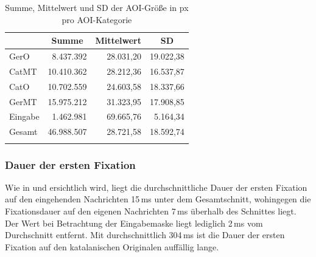 

\begin{table}
\begin{tabular}{lrrr}  
\lsptoprule
    \multicolumn{1}{c}{AOI-Kategorie} & \multicolumn{1}{c}{Summe} & \multicolumn{1}{c}{Mittelwert} & \multicolumn{1}{c}{SD} \\ 
    \midrule
    GerO  & 8.437.392 & 28.031,20 & 19.022,38 \\ 
    CatMT & 10.410.362 & 28.212,36 & 16.537,87 \\ 
    CatO & 10.702.559 & 24.603,58 & 18.337,66 \\ 
    GerMT & 15.975.212 & 31.323,95 & 17.908,85 \\ 
    Eingabe & 1.462.981 & 69.665,76  & 5.164,34 \\ 
    \midrule
    Gesamt & 46.988.507 & 28.721,58 & 18.592,74 \\ 
    \lspbottomrule
\end{tabular}
    \caption{Summe, Mittelwert und SD der AOI-Größe in px pro AOI-Kategorie\label{K6:tab:CatDe:mean-sd-iaarea}}
\end{table}


   


\subsubsection{Dauer der ersten Fixation}
\label{K6:subsubsec:iaffd:catde}


Wie in  und  ersichtlich wird, liegt die durchschnittliche Dauer der ersten Fixation auf den eingehenden Nachrichten 15\,ms unter dem Gesamtschnitt, wohingegen die Fixationsdauer auf den eigenen Nachrichten 7\,ms überhalb des Schnittes liegt. Der Wert bei Betrachtung der Eingabemaske liegt lediglich 2\,ms vom Durchschnitt entfernt. Mit durchschnittlich 304\,ms ist die Dauer der ersten Fixation auf den katalanischen Originalen auffällig lange.

